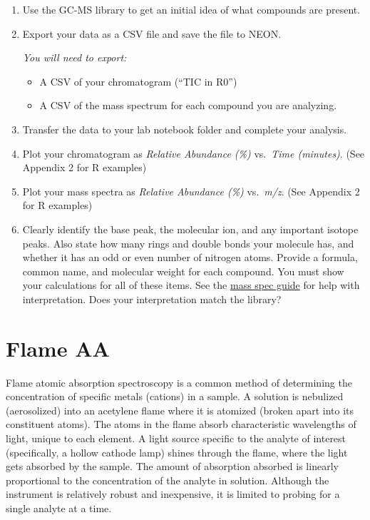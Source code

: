\documentclass[]{tufte-book}
\providecommand{\tightlist}{%
  \setlength{\itemsep}{0pt}\setlength{\parskip}{0pt}}
\begin{document}
\begin{enumerate}
\def\labelenumi{\arabic{enumi}.}
\item
  Use the GC-MS library to get an initial idea of what compounds are present.
\item
  Export your data as a CSV file and save the file to NEON.

  \emph{You will need to export:}

  \begin{itemize}
  \tightlist
  \item
    A CSV of your chromatogram (``TIC in R0'')\\
  \item
    A CSV of the mass spectrum for each compound you are analyzing.
  \end{itemize}
\item
  Transfer the data to your lab notebook folder and complete your analysis.
\item
  Plot your chromatogram as \emph{Relative Abundance (\%)} vs.~\emph{Time (minutes)}. (See Appendix 2 for R examples)
\item
  Plot your mass spectra as \emph{Relative Abundance (\%)} vs.~\emph{m/z}. (See Appendix 2 for R examples)
\item
  Clearly identify the base peak, the molecular ion, and any important isotope peaks. Also state how many rings and double bonds your molecule has, and whether it has an odd or even number of nitrogen atoms. Provide a formula, common name, and molecular weight for each compound. You must show your calculations for all of these items. See the \href{/chem370/guides/mass-spec}{mass spec guide} for help with interpretation. Does your interpretation match the library?
\end{enumerate}

\newpage

\hypertarget{am-faas}{%
\section{Flame AA}\label{am-faas}}

Flame atomic absorption spectroscopy is a common method of determining the concentration of specific metals (cations) in a sample. A solution is nebulized (aerosolized) into an acetylene flame where it is atomized (broken apart into its constituent atoms). The atoms in the flame absorb characteristic wavelengths of light, unique to each element. A light source specific to the analyte of interest (specifically, a hollow cathode lamp) shines through the flame, where the light gets absorbed by the sample. The amount of absorption absorbed is linearly proportional to the concentration of the analyte in solution. Although the instrument is relatively robust and inexpensive, it is limited to probing for a single analyte at a time.
\end{document}
